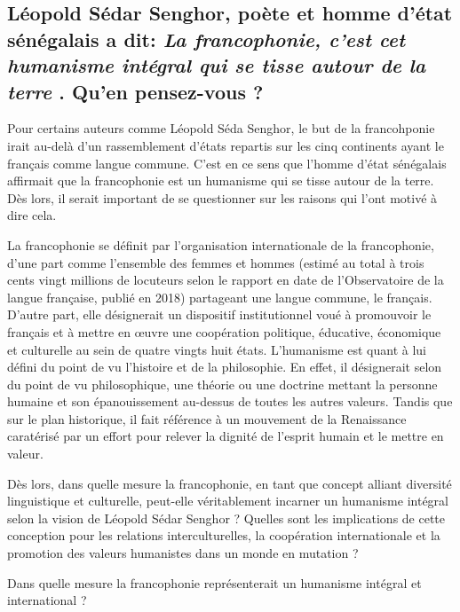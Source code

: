 \newpage \begin{center}
	\subsection*{Léopold Sédar Senghor, poète et homme d’état sénégalais a dit: \guillemetleft \textit{La francophonie, c’est cet humanisme intégral qui se tisse autour de la terre} \guillemetright. Qu’en pensez-vous ? }
\end{center}

Pour certains auteurs comme Léopold Séda Senghor, le but de la francohponie irait au-delà d'un rassemblement d'états repartis sur les cinq continents ayant le français comme langue commune. C'est en ce sens que l'homme d'état sénégalais affirmait que la francophonie est un humanisme qui se tisse autour de la terre. Dès lors, il serait important de se questionner sur les raisons qui l'ont motivé à dire cela.

La francophonie se définit par l'organisation internationale de la francophonie, d'une part comme l'ensemble des femmes et hommes (estimé au total à trois cents vingt millions de locuteurs selon le rapport en date de l'Observatoire de la langue française, publié en 2018) partageant une langue commune, le français. D'autre part, elle désignerait un dispositif institutionnel voué à promouvoir le français et à mettre en œuvre une coopération politique, éducative, économique et culturelle au sein de quatre vingts huit états. L'humanisme est quant à lui défini du point de vu l'histoire et de la philosophie. En effet, il désignerait selon du point de vu philosophique, une théorie ou une doctrine mettant la personne humaine et son épanouissement au-dessus de toutes les autres valeurs. Tandis que sur le plan historique, il fait référence à un mouvement de la Renaissance caratérisé par un effort pour relever la dignité de l'esprit humain et le mettre en valeur.

Dès lors, dans quelle mesure la francophonie, en tant que concept alliant diversité linguistique et culturelle, peut-elle véritablement incarner un humanisme intégral selon la vision de Léopold Sédar Senghor ? Quelles sont les implications de cette conception pour les relations interculturelles, la coopération internationale et la promotion des valeurs humanistes dans un monde en mutation ?

Dans quelle mesure la francophonie représenterait un humanisme intégral et international ?

